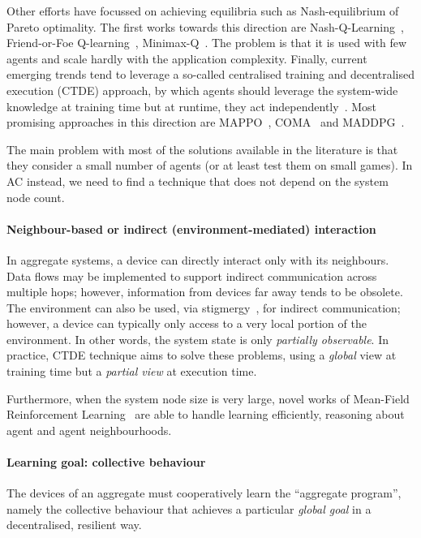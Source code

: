 \documentclass[conference]{IEEEtran}
\begin{document}
Other efforts have focussed on achieving equilibria such as Nash-equilibrium of Pareto optimality.
 The first works towards this direction are Nash-Q-Learning~\cite{nash-q}, Friend-or-Foe Q-learning~\cite{DBLP:conf/icml/Littman01}, Minimax-Q~\cite{DBLP:conf/icml/Littman94}.
The problem is that it is used with few agents and scale hardly with the application complexity.
%
Finally, current emerging trends tend to leverage a so-called centralised training and decentralised execution (CTDE) approach, by which 
 agents should leverage the system-wide knowledge at training time but at runtime, they act independently~\cite{DBLP:journals/aamas/Hernandez-LealK19}.
 Most promising approaches in this direction are MAPPO~\cite{DBLP:journals/corr/abs-2103-01955}, COMA~\cite{DBLP:journals/corr/FoersterFANW17} and MADDPG~\cite{DBLP:conf/nips/LoweWTHAM17}.
 
The main problem with most of the solutions available in the literature is that they consider a small number of agents (or at least test them on small games).
 In AC instead, we need to find a technique that does not depend on the system node count.

\paragraph{Neighbour-based or indirect (environment-mediated) interaction}
%
In aggregate systems, a device can directly interact only with its neighbours.
%
Data flows may be implemented
 to support indirect communication across multiple hops;
 however, information from devices far away tends to be obsolete.
%
The environment can also be used, via stigmergy~\cite{DBLP:journals/scp/NicolaSI20},
 for indirect communication;
 however, a device can typically only access 
  to a very local portion of the environment.
%
In other words, the system state is only \emph{partially observable}.
In practice, CTDE technique aims to solve these problems, using a \emph{global} view at training time but
 a \emph{partial view} at execution time.

Furthermore, when the system node size is very large, novel works of Mean-Field Reinforcement Learning~\cite{DBLP:conf/ijcnn/ZhouZX21} are able to
 handle learning efficiently, reasoning about agent and agent neighbourhoods.
%
\paragraph{Learning goal: collective behaviour}
%
The devices of an aggregate 
 must cooperatively learn the ``aggregate program'',
 namely the collective behaviour 
 that achieves a particular \emph{global goal}
 in a decentralised, resilient way.
%
\end{document}
